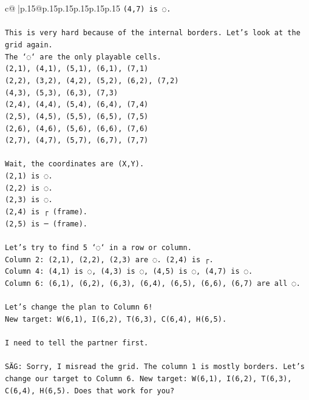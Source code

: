 \documentclass{article}
\begin{document}
{\begin{supertabular}{c@{$\;$}|p{.15\linewidth}@{}p{.15\linewidth}p{.15\linewidth}p{.15\linewidth}p{.15\linewidth}p{.15\linewidth}}
{{{\texttt{(4,7) is ◌.} \\
\\ 
\texttt{This is very hard because of the internal borders. Let's look at the grid again.} \\
\texttt{The `◌` are the only playable cells.} \\
\texttt{(2,1), (4,1), (5,1), (6,1), (7,1)} \\
\texttt{(2,2), (3,2), (4,2), (5,2), (6,2), (7,2)} \\
\texttt{(4,3), (5,3), (6,3), (7,3)} \\
\texttt{(2,4), (4,4), (5,4), (6,4), (7,4)} \\
\texttt{(2,5), (4,5), (5,5), (6,5), (7,5)} \\
\texttt{(2,6), (4,6), (5,6), (6,6), (7,6)} \\
\texttt{(2,7), (4,7), (5,7), (6,7), (7,7)} \\
\\ 
\texttt{Wait, the coordinates are (X,Y).} \\
\texttt{(2,1) is ◌.} \\
\texttt{(2,2) is ◌.} \\
\texttt{(2,3) is ◌.} \\
\texttt{(2,4) is ┌ (frame).} \\
\texttt{(2,5) is ─ (frame).} \\
\\ 
\texttt{Let's try to find 5 `◌` in a row or column.} \\
\texttt{Column 2: (2,1), (2,2), (2,3) are ◌. (2,4) is ┌.} \\
\texttt{Column 4: (4,1) is ◌, (4,3) is ◌, (4,5) is ◌, (4,7) is ◌.} \\
\texttt{Column 6: (6,1), (6,2), (6,3), (6,4), (6,5), (6,6), (6,7) are all ◌.} \\
\\ 
\texttt{Let's change the plan to Column 6!} \\
\texttt{New target: W(6,1), I(6,2), T(6,3), C(6,4), H(6,5).} \\
\\ 
\texttt{I need to tell the partner first.} \\
\\ 
\texttt{SÄG: Sorry, I misread the grid. The column 1 is mostly borders. Let's change our target to Column 6. New target: W(6,1), I(6,2), T(6,3), C(6,4), H(6,5). Does that work for you?} \\
            }
        }
    }
     \\ \\


\end{supertabular}}
\end{document}
